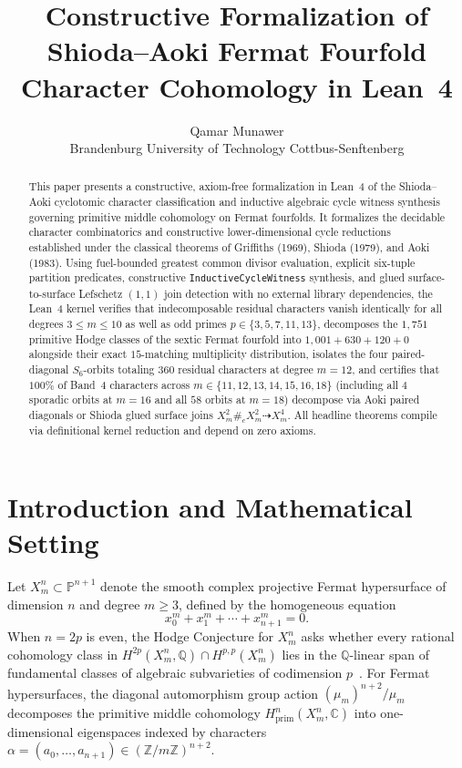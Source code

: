 \documentclass[11pt,a4paper]{article}
\title{\textbf{Constructive Formalization of Shioda--Aoki Fermat Fourfold Character Cohomology in Lean~4}}
\author{Qamar Munawer \\ Brandenburg University of Technology Cottbus-Senftenberg}
\date{}
\begin{document}
\maketitle

\begin{abstract}
This paper presents a constructive, axiom-free formalization in Lean~4 of the Shioda--Aoki cyclotomic character classification and inductive algebraic cycle witness synthesis governing primitive middle cohomology on Fermat fourfolds. It formalizes the decidable character combinatorics and constructive lower-dimensional cycle reductions established under the classical theorems of Griffiths (1969), Shioda (1979), and Aoki (1983). Using fuel-bounded greatest common divisor evaluation, explicit six-tuple partition predicates, constructive \texttt{InductiveCycleWitness} synthesis, and glued surface-to-surface Lefschetz $(1,1)$ join detection with no external library dependencies, the Lean~4 kernel verifies that indecomposable residual characters vanish identically for all degrees $3 \le m \le 10$ as well as odd primes $p \in \{3, 5, 7, 11, 13\}$, decomposes the $1{,}751$ primitive Hodge classes of the sextic Fermat fourfold into $1{,}001 + 630 + 120 + 0$ alongside their exact $15$-matching multiplicity distribution, isolates the four paired-diagonal $S_6$-orbits totaling $360$ residual characters at degree $m = 12$, and certifies that $100\%$ of Band~4 characters across $m \in \{11, 12, 13, 14, 15, 16, 18\}$ (including all $4$ sporadic orbits at $m = 16$ and all $58$ orbits at $m = 18$) decompose via Aoki paired diagonals or Shioda glued surface joins $X_m^2 \#_c X_m^2 \dashrightarrow X_m^4$. All headline theorems compile via definitional kernel reduction and depend on zero axioms.
\end{abstract}

\section{Introduction and Mathematical Setting}

Let $X_m^n \subset \mathbb{P}^{n+1}$ denote the smooth complex projective Fermat hypersurface of dimension $n$ and degree $m \ge 3$, defined by the homogeneous equation
\begin{equation}
  x_0^m + x_1^m + \cdots + x_{n+1}^m = 0.
\end{equation}
When $n = 2p$ is even, the Hodge Conjecture for $X_m^n$ asks whether every rational cohomology class in $H^{2p}(X_m^n, \mathbb{Q}) \cap H^{p,p}(X_m^n)$ lies in the $\mathbb{Q}$-linear span of fundamental classes of algebraic subvarieties of codimension $p$~\cite{Deligne2000}. For Fermat hypersurfaces, the diagonal automorphism group action $(\mu_m)^{n+2}/\mu_m$ decomposes the primitive middle cohomology $H^n_{\mathrm{prim}}(X_m^n, \mathbb{C})$ into one-dimensional eigenspaces indexed by characters $\alpha = (a_0, \dots, a_{n+1}) \in (\mathbb{Z}/m\mathbb{Z})^{n+2}$.
\end{document}
